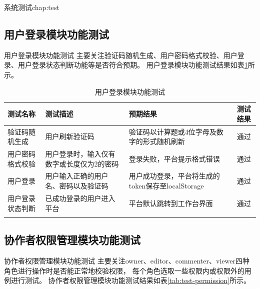 \begin{cuzchapter}{系统测试}{chap:test}
    \subsection{用户登录模块功能测试}
    用户登录模块功能测试
    主要关注验证码随机生成、用户密码格式校验、用户登录、用户登录状态判断功能等是否符合预期。
    用户登录模块功能测试结果如表\ref{tab:test-login}所示。
    \begin{table}[htbp]
    \caption{用户登录模块功能测试}

    \label{tab:test-login}
    \centering
    \begin{tabular}{>{\raggedright\arraybackslash}p{2.5cm} >{\raggedright\arraybackslash}p{5.5cm} >{\raggedright\arraybackslash}p{4cm} c}
        \toprule
        测试名称 & 测试描述 & 预期结果 & 测试结果 \\
        \midrule
        验证码随机生成 & 用户刷新验证码 & 验证码以计算题或4位字母及数字的形式随机刷新 & 通过 \\
        \addlinespace 
        用户密码格式校验 & 用户登录时，输入仅有数字或长度仅为2的密码 & 登录失败，平台提示格式错误 & 通过 \\
        \addlinespace
        用户登录 & 用户输入正确的用户名、密码以及验证码 & 用户成功登录，平台将生成的token保存至localStorage & 通过 \\
         \addlinespace 
        用户登录状态判断 & 已成功登录的用户进入平台 & 平台默认跳转到工作台界面 & 通过 \\
        \addlinespace
        \bottomrule
    \end{tabular}
\end{table}
\subsection{协作者权限管理模块功能测试}
    协作者权限管理模块功能测试
    主要关注owner、editor、commenter、viewer四种角色进行操作时是否能正常地校验权限，
    每个角色选取一些权限内或权限外的用例进行测试。
    协作者权限管理模块功能测试结果如表\ref{tab:test-permission}所示。


\end{cuzchapter}
